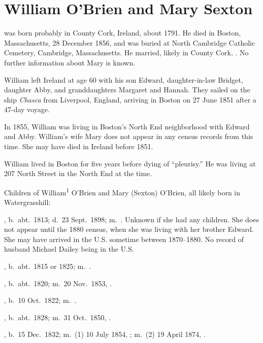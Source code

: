 \section{William O'Brien and Mary Sexton}

 was born probably in County Cork, Ireland, about 1791.\cite{Census1855William} He died in Boston, Massachusetts, 28 December 1856,\cite{William1OBrienDeath} and was buried at North Cambridge Catholic Cemetery, Cambridge, Massachusetts.\cite{DianaBerberenaLetter1} He married, likely in County Cork, .\cite{Michael2OBrienDeath,Abigail2OBrienDeath,Ann2OBrienDeath,Mary2OBrienDeath} No further information about Mary is known.

William left Ireland at age 60 with his son Edward, daughter-in-law Bridget, daughter Abby, and granddaughters Margaret and Hannah. They sailed on the ship \textit{Chasca}\cite{Chascay2} from Liverpool, England, arriving in Boston on 27 June 1851 after a 47-day voyage.\cite{Chascay}

In 1855, William was living in Boston's North End neighborhood with Edward and Abby.\cite{Census1855William,Wards} William's wife Mary does not appear in any census records from this time. She may have died in Ireland before 1851.

William lived in Boston for five years before dying of ``pleurisy.'' He was living at 207 North Street in the North End at the time.\cite{William1OBrienDeath}

\begin{KidsIntro}
	Children of William\textsuperscript{1} O'Brien and Mary (Sexton) O'Brien, all likely born in Watergrasshill:
\end{KidsIntro}

\begin{Kids}
	, b.\ abt.\ 1813;\cite{1880CensusAnn} d.\ 23 Sept.\ 1898;\cite{Ann2OBrienDeath} m.\ .\cite{Ann2OBrienDeath} Unknown if she had any children. She does not appear until the 1880 census, when she was living with her brother Edward. She may have arrived in the U.S. sometime between 1870--1880. No record of husband Michael Dailey being in the U.S.
	
	, b.\ abt.\ 1815 or 1825; m.\ .
	
	, b.\ abt.\ 1820; m.\ 20 Nov.\ 1853, .
	
	, b.\ 10 Oct.\ 1822; m.\ .
		
	, b.\ abt.\ 1828; m.\ 31 Oct.\ 1850, .
	
	, b.\ 15 Dec.\ 1832; m.\ (1) 10 July 1854, ; m.\ (2) 19 April 1874, .
			
\end{Kids}
